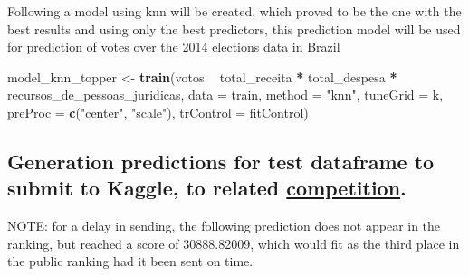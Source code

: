\documentclass[]{article}
\newenvironment{Shaded}{\begin{snugshade}}{\end{snugshade}}
\newcommand{\KeywordTok}[1]{\textcolor[rgb]{0.13,0.29,0.53}{\textbf{#1}}}
\newcommand{\DataTypeTok}[1]{\textcolor[rgb]{0.13,0.29,0.53}{#1}}
\newcommand{\StringTok}[1]{\textcolor[rgb]{0.31,0.60,0.02}{#1}}
\newcommand{\OperatorTok}[1]{\textcolor[rgb]{0.81,0.36,0.00}{\textbf{#1}}}
\newcommand{\NormalTok}[1]{#1}
\begin{document}
Following a model using knn will be created, which proved to be the one
with the best results and using only the best predictors, this
prediction model will be used for prediction of votes over the 2014
elections data in Brazil

\begin{Shaded}
\begin{Highlighting}[]
\NormalTok{model_knn_topper <-}\StringTok{ }\KeywordTok{train}\NormalTok{(votos }\OperatorTok{~}\StringTok{ }\NormalTok{total_receita }\OperatorTok{*}\StringTok{ }\NormalTok{total_despesa }\OperatorTok{*}\StringTok{ }\NormalTok{recursos_de_pessoas_juridicas, }
                     \DataTypeTok{data =}\NormalTok{ train, }
                     \DataTypeTok{method =} \StringTok{"knn"}\NormalTok{, }
                     \DataTypeTok{tuneGrid =}\NormalTok{ k,}
                     \DataTypeTok{preProc =} \KeywordTok{c}\NormalTok{(}\StringTok{"center"}\NormalTok{, }\StringTok{"scale"}\NormalTok{),}
                     \DataTypeTok{trControl =}\NormalTok{ fitControl)}
\end{Highlighting}
\end{Shaded}

\subsection{\texorpdfstring{Generation predictions for test dataframe to
submit to Kaggle, to related
\href{https://www.kaggle.com/c/ufcg-cdp-20182}{competition}.}{Generation predictions for test dataframe to submit to Kaggle, to related competition.}}\label{generation-predictions-for-test-dataframe-to-submit-to-kaggle-to-related-competition.}

NOTE: for a delay in sending, the following prediction does not appear
in the ranking, but reached a score of 30888.82009, which would fit as
the third place in the public ranking had it been sent on time.

\begin{Shaded}
\end{Shaded}
\end{document}
